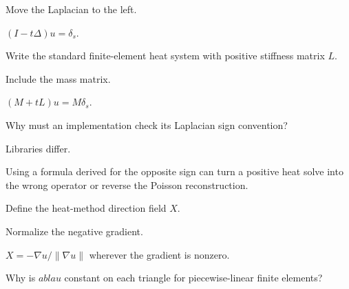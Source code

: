 \begin{hint}
Move the Laplacian to the left.
\end{hint}

\begin{solution}
\((I-t\Delta)u=\delta_s\).
\end{solution}

\begin{exercise}\label{exr:vii40-03}
Write the standard finite-element heat system with positive stiffness matrix \(L\).
\end{exercise}

\begin{hint}
Include the mass matrix.
\end{hint}

\begin{solution}
\((M+tL)u=M\delta_s\).
\end{solution}

\begin{exercise}\label{exr:vii40-04}
Why must an implementation check its Laplacian sign convention?
\end{exercise}

\begin{hint}
Libraries differ.
\end{hint}

\begin{solution}
Using a formula derived for the opposite sign can turn a positive heat solve into the wrong operator or reverse the Poisson reconstruction.
\end{solution}

\begin{exercise}\label{exr:vii40-05}
Define the heat-method direction field \(X\).
\end{exercise}

\begin{hint}
Normalize the negative gradient.
\end{hint}

\begin{solution}
\(X=-\nabla u/\|\nabla u\|\) wherever the gradient is nonzero.
\end{solution}

\begin{exercise}\label{exr:vii40-06}
Why is \(
abla u\) constant on each triangle for piecewise-linear finite elements?
\end{exercise}

